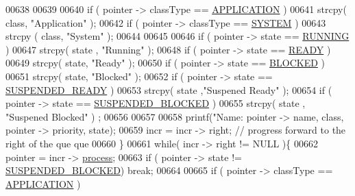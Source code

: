 \begin{DoxyCode}
{{{{{00638                 
00639                 
00640                 \textcolor{keywordflow}{if} ( pointer -> classType  == \hyperlink{mpx__r2_8h_a796bd7c6ba2e59281760fb155c6287e8}{APPLICATION} )
00641                         strcpy( \textcolor{keyword}{class}, \textcolor{stringliteral}{"Application"} );
00642                 \textcolor{keywordflow}{if} (  pointer -> classType == \hyperlink{mpx__r2_8h_a21b97df85e65556468b28a576311271c}{SYSTEM} )
00643                         strcpy ( \textcolor{keyword}{class}, \textcolor{stringliteral}{"System"} );
00644                 
00645                 
00646                 \textcolor{keywordflow}{if} ( pointer -> state == \hyperlink{mpx__r2_8h_a6fb7181d994ee98e735494be55809708}{RUNNING} ) 
00647                         strcpy( state , \textcolor{stringliteral}{"Running"} );
00648                 \textcolor{keywordflow}{if} ( pointer -> state == \hyperlink{mpx__r2_8h_ad1235d5ce36f7267285e82dccd428aa6}{READY} ) 
00649                         strcpy( state, \textcolor{stringliteral}{"Ready"} );
00650                 \textcolor{keywordflow}{if} ( pointer -> state == \hyperlink{mpx__r2_8h_a48f6457243719e7031768d4100741159}{BLOCKED} ) 
00651                         strcpy( state, \textcolor{stringliteral}{"Blocked"} );
00652                 \textcolor{keywordflow}{if} ( pointer -> state == \hyperlink{mpx__r2_8h_a07b1141143e8825b04670da23fca8cc7}{SUSPENDED_READY} ) 
00653                         strcpy( state ,\textcolor{stringliteral}{"Suspened Ready"} );
00654                 \textcolor{keywordflow}{if} ( pointer -> state == \hyperlink{mpx__r2_8h_a6e41bb5a80c5049e8d364bab8ee4d73a}{SUSPENDED_BLOCKED} ) 
00655                         strcpy( state , \textcolor{stringliteral}{"Suspened Blocked"} ) ;
00656                 
00657                 
00658                 printf(\textcolor{stringliteral}{"Name: %
      pointer -> name, \textcolor{keyword}{class}, pointer -> priority, state); 
00659                 incr = incr -> right; \textcolor{comment}{// progress forward to the right of the que
      que}
00660         \}
00661         \textcolor{keywordflow}{while}( incr -> right != NULL )\{
00662                 pointer = incr -> \hyperlink{structprocess}{process};
00663                 \textcolor{keywordflow}{if} ( pointer -> state != \hyperlink{mpx__r2_8h_a6e41bb5a80c5049e8d364bab8ee4d73a}{SUSPENDED_BLOCKED}) \textcolor{keywordflow}{break};
00664                 
00665                 \textcolor{keywordflow}{if} ( pointer -> classType  == \hyperlink{mpx__r2_8h_a796bd7c6ba2e59281760fb155c6287e8}{APPLICATION} )
}}}}}}
\end{DoxyCode}

